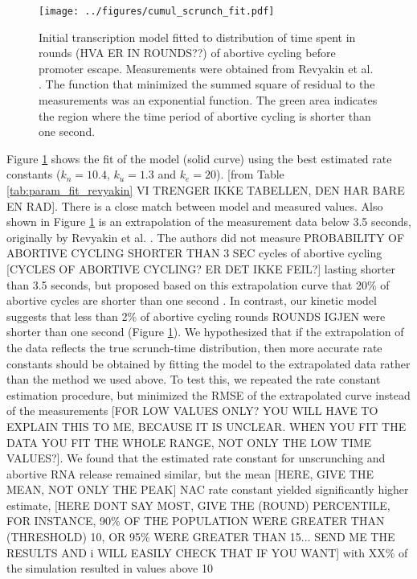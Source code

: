\begin{figure}
    \begin{center}
      \texttt{[image: ../figures/cumul\_scrunch\_fit.pdf]}
    \end{center}
    \caption{Initial transcription model fitted to distribution of time spent
      in rounds (HVA ER IN ROUNDS??) of abortive cycling before promoter escape. Measurements were obtained
      from Revyakin et al. \cite{revyakin_abortive_2006}. The function that minimized the summed square of residual to the measurements was an exponential function. The green area indicates the
      region where the time period of abortive cycling is shorter than one second.}
\label{fig:revyakin_fit}
\end{figure}

Figure \ref{fig:revyakin_fit} shows the fit of the model (solid curve) using the best
estimated rate constants ($k_n=10.4$, $k_u=1.3$ and $k_e=20$).   [from Table \ref{tab:param_fit_revyakin} VI TRENGER IKKE TABELLEN, DEN HAR BARE EN RAD]. There is a
close match between model and measured values. Also shown in Figure
\ref{fig:revyakin_fit} is an extrapolation of the measurement data below 3.5 seconds, originally
by Revyakin et al. \cite{revyakin_abortive_2006}. The authors did
not measure PROBABILITY OF ABORTIVE CYCLING SHORTER THAN 3 SEC cycles of abortive cycling [CYCLES OF ABORTIVE CYCLING? ER DET IKKE FEIL?] lasting shorter than 3.5 seconds, but
proposed based on this extrapolation curve that 20\% of abortive cycles are
shorter than one second \cite{revyakin_abortive_2006}.  In contrast, our kinetic model suggests that less than 2\% of
abortive cycling rounds ROUNDS IGJEN were shorter than one second (Figure
\ref{fig:revyakin_fit}). We hypothesized that if the extrapolation of the data reflects the true
scrunch-time distribution, then more accurate rate constants should be obtained by
fitting the model to the extrapolated data rather than the method we used above. To
test this, we repeated the rate constant estimation procedure, but minimized the RMSE of the extrapolated curve instead of the measurements [FOR LOW VALUES ONLY? YOU WILL HAVE TO EXPLAIN THIS TO ME, BECAUSE IT IS UNCLEAR. WHEN YOU FIT THE DATA YOU FIT THE WHOLE RANGE, NOT ONLY THE LOW TIME VALUES?]. We found that the estimated rate constant for unscrunching and abortive RNA release remained
similar, but the mean [HERE, GIVE THE MEAN, NOT ONLY THE PEAK] NAC rate
constant yielded significantly higher estimate, [HERE DONT SAY MOST, GIVE THE (ROUND) PERCENTILE, FOR INSTANCE, 90\% OF THE POPULATION WERE GREATER THAN (THRESHOLD) 10, OR 95\% WERE GREATER THAN 15... SEND ME THE RESULTS AND i WILL EASILY CHECK THAT IF YOU WANT] with XX\% of the simulation resulted in values above 10
